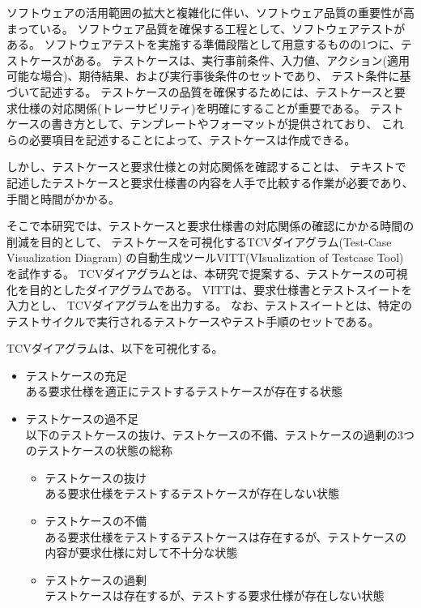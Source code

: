 \documentclass[uplatex, 10pt, a4j, dvipdfmx]{jsarticle}
\newcommand{\tool}{VITT}
\begin{document}
\AbstractHeader
\begin{AbstractBody}
\fi

ソフトウェアの活用範囲の拡大と複雑化に伴い、ソフトウェア品質の重要性が高まっている。
ソフトウェア品質を確保する工程として、ソフトウェアテストがある。
ソフトウェアテストを実施する準備段階として用意するものの1つに、テストケースがある。
テストケースは、実行事前条件、入力値、アクション(適用可能な場合)、期待結果、および実行事後条件のセットであり、
テスト条件に基づいて記述する。
テストケースの品質を確保するためには、テストケースと要求仕様の対応関係(トレーサビリティ)を明確にすることが重要である。
テストケースの書き方として、テンプレートやフォーマットが提供されており、
これらの必要項目を記述することによって、テストケースは作成できる。

しかし、テストケースと要求仕様との対応関係を確認することは、
テキストで記述したテストケースと要求仕様書の内容を人手で比較する作業が必要であり、手間と時間がかかる。

そこで本研究では、テストケースと要求仕様書の対応関係の確認にかかる時間の削減を目的として、
テストケースを可視化するTCVダイアグラム(Test-Case Visualization Diagram)
の自動生成ツール\tool{}(VIsualization of Testcase Tool)を試作する。
TCVダイアグラムとは、本研究で提案する、テストケースの可視化を目的としたダイアグラムである。
\tool{}は、要求仕様書とテストスイートを入力とし、
TCVダイアグラムを出力する。
なお、テストスイートとは、特定のテストサイクルで実行されるテストケースやテスト手順のセットである。

TCVダイアグラムは、以下を可視化する。

\begin{itemize}
    \item テストケースの充足\\
    ある要求仕様を適正にテストするテストケースが存在する状態
    \item テストケースの過不足\\
    以下のテストケースの抜け、テストケースの不備、テストケースの過剰の3つのテストケースの状態の総称
    \begin{itemize}
        \item テストケースの抜け\\
        ある要求仕様をテストするテストケースが存在しない状態
        \item テストケースの不備\\
        ある要求仕様をテストするテストケースは存在するが、テストケースの内容が要求仕様に対して不十分な状態
        \item テストケースの過剰\\
        テストケースは存在するが、テストする要求仕様が存在しない状態
    \end{itemize}
\end{itemize}


\end{AbstractBody}
\end{document}
